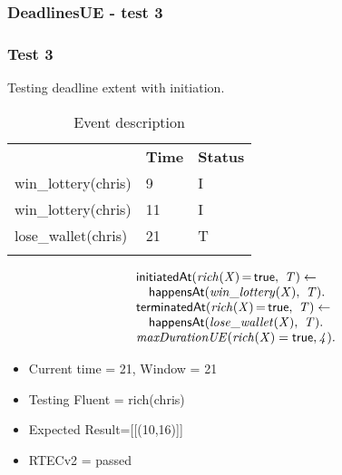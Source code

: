 \documentclass[8pt]{beamer}
\DeclareMathOperator{\val}{=}  %
\def \patsize {}
\def\happensAt{\textsf{\patsize happensAt}}
\def\initiatedAt{\textsf{\patsize initiatedAt}}
\def\terminatedAt{\textsf{\patsize terminatedAt}}
\def\true{\textsf{\patsize true}}
\newenvironment{mysplit}%
  {\arraycolsep 0pt \begin{array}{l}}%
  {\end{array}}
\begin{document}
\begin{frame}
    \frametitle{DeadlinesUE - test 3}
    \subsubsection{Test 3}
    \small
    Testing deadline extent with initiation.\linebreak
    \begin{minipage}{0.48\linewidth}
        \begin{table}[t!]
            \caption{Event description}
            \begin{center}

                \begin{tabular}{lll}
                    \hline\noalign{\smallskip}
                    \multicolumn{1}{l}{\textbf{Event}} & \multicolumn{1}{c}{\textbf{Time}} & \multicolumn{1}{c}{\textbf{Status}} \\
                    win\_lottery(chris)& 9 & I\\
                    win\_lottery(chris)& 11 & I\\
                    lose\_wallet(chris)& 21 & T\\
                    \noalign{\smallskip}
                    \hline
                \end{tabular}
            \end{center}
        \end{table}
    \end{minipage}
    \begin{minipage}{0.48\linewidth}
        \begin{align*}
            \begin{mysplit}
                \initiatedAt\mathit{(rich(X)\val\true,\ T) \leftarrow}\\
                \quad    \happensAt\mathit{(win\_lottery(X),\ T).}\\
                \terminatedAt\mathit{(rich(X)\val\true,\ T) \leftarrow}\\
                \quad    \happensAt\mathit{(lose\_wallet(X),\ T)}.\\
                \mathit{maxDurationUE(rich(X)=\true,4)}.\\
            \end{mysplit}
        \end{align*}
    \end{minipage}
    \begin{itemize}
        \item Current time = 21, Window = 21
        \item Testing Fluent = rich(chris)
        \item Expected Result=[[(10,16)]]
        \item RTECv2 = passed
    \end{itemize}
\end{frame}
\end{document}
